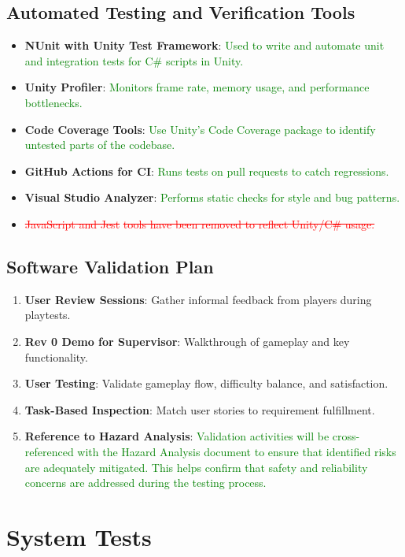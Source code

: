 \documentclass[12pt]{article}
\newcommand{\removed}[1]{\textcolor{red}{\sout{#1}}}
\newcommand{\added}[1]{\textcolor{green}{#1}}
\begin{document}
\subsection{Automated Testing and Verification Tools}
\begin{itemize}
    \item \textbf{NUnit with Unity Test Framework}: \added{Used to write and automate unit and integration tests for C\# scripts in Unity.}
    \item \textbf{Unity Profiler}: \added{Monitors frame rate, memory usage, and performance bottlenecks.}
    \item \textbf{Code Coverage Tools}: \added{Use Unity’s Code Coverage package to identify untested parts of the codebase.}
    \item \textbf{GitHub Actions for CI}: \added{Runs tests on pull requests to catch regressions.}
    \item \textbf{Visual Studio Analyzer}: \added{Performs static checks for style and bug patterns.}
    \item \removed{JavaScript and Jest} \removed{tools have been removed to reflect Unity/C\# usage.}
\end{itemize}

\subsection{Software Validation Plan}
\begin{enumerate}
    \item \textbf{User Review Sessions}: Gather informal feedback from players during playtests.
    \item \textbf{Rev 0 Demo for Supervisor}: Walkthrough of gameplay and key functionality.
    \item \textbf{User Testing}: Validate gameplay flow, difficulty balance, and satisfaction.
    \item \textbf{Task-Based Inspection}: Match user stories to requirement fulfillment.
    \item \textbf{Reference to Hazard Analysis}: \added{Validation activities will be cross-referenced with the Hazard Analysis document to ensure that identified risks are adequately mitigated. This helps confirm that safety and reliability concerns are addressed during the testing process.}
\end{enumerate}

\section{System Tests}
\end{document}
